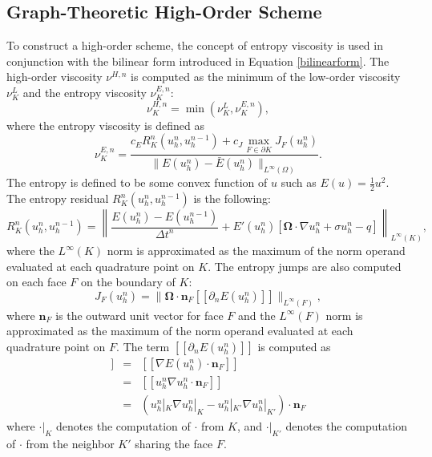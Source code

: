 \subsection{Graph-Theoretic High-Order Scheme}\label{gthighorder}
To construct a high-order scheme, the concept of entropy viscosity is used in
conjunction with the bilinear form introduced in Equation \eqref{bilinearform}.
The high-order viscosity $\nu^{H,n}$ is computed as the minimum of the low-order
viscosity $\nu^{L}_K$ and the entropy viscosity $\nu^{E,n}_K$:
\begin{equation}
   \nu^{H,n}_K = \min(\nu^{L}_K,\nu^{E,n}_K),
\end{equation}
where the entropy viscosity is defined as
\begin{equation}
   \nu^{E,n}_K = \frac{c_E R_K^n(u_h^n,u_h^{n-1})
      + c_J\max\limits_{F\in\partial K}J_F(u_h^n)}
      {\|E(u_h^n)-\bar{E}(u_h^n)\|_{L^\infty(\Omega)}}.
\end{equation}
The entropy is defined to be some convex function of $u$ such as $E(u)=\frac{1}{2}u^2$.
The entropy residual $R_K^n(u_h^n,u_h^{n-1})$ is the following:
\begin{equation}
    R_K^n(u_h^n,u_h^{n-1}) = \left\|\frac{E(u_h^n)-E(u_h^{n-1})}{\Delta t^n}
      + E'(u_h^n)\left[\mathbf{\Omega}\cdot\nabla u_h^n
      + \sigma u_h^n
      - q\right]\right\|_{L^\infty(K)},
\end{equation}
where the $L^\infty(K)$ norm is approximated as the maximum of the norm operand evaluated
at each quadrature point on $K$.
The entropy jumps are also computed on each face $F$ on the boundary of $K$:
\begin{equation}
   J_F(u_h^n) = \|\mathbf{\Omega}\cdot
      \mathbf{n}_F[\![\partial_n E(u_h^n)]\!]\|_{L^\infty(F)},
\end{equation}
where $\mathbf{n}_F$ is the outward unit vector for face $F$ and
the $L^\infty(F)$ norm is approximated as the maximum of the norm operand evaluated
at each quadrature point on $F$. The term $[\![\partial_n E(u_h^n)]\!]$ is computed as
\begin{eqnarray}
   [\![\partial_n E(u_h^n)]\!] & = & [\![\nabla E(u_h^n)\cdot\mathbf{n}_F]\!]\\
                        & = & [\![u_h^n\nabla u_h^n\cdot\mathbf{n}_F]\!]\\
                        & = & (u_h^n|_K\nabla u_h^n|_K - u_h^n|_{K'}
                           \nabla u_h^n|_{K'})\cdot\mathbf{n}_F
\end{eqnarray}
where $\cdot|_K$ denotes the computation of $\cdot$ from $K$, and $\cdot|_{K'}$
denotes the computation of $\cdot$ from the neighbor $K'$ sharing the face $F$.

